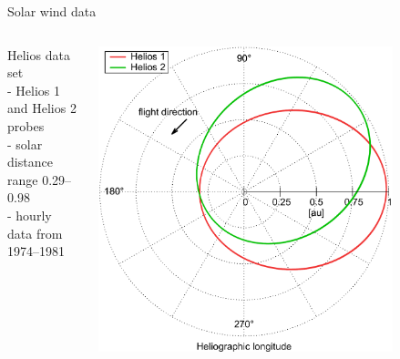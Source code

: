 \begin{frame}[plain,c]{Solar wind data}{}
	\begin{columns}[c]
		
		Helios data set \citep{Rosenbauer1977}\\
		- Helios 1 and Helios 2 probes\\
		- solar distance range \SIrange{0.29}{0.98}{\au}\\
		- hourly data from 1974--1981\\\ 
		
		\includegraphics[width=0.8\textwidth]{../talk_figures/Helios12_orbits_ecliptic.png}

		

\end{columns}
\end{frame}
